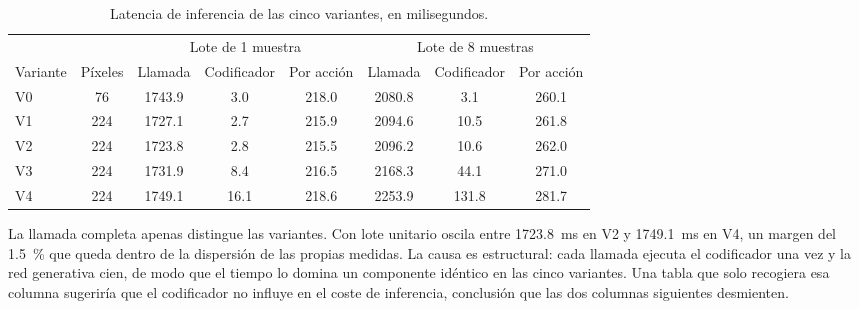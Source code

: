 \begin{table}[htbp]
  \centering
  \caption{Latencia de inferencia de las cinco variantes, en milisegundos.}
  \label{tab:latencia}
  \small
  \begin{tabular}{lccccccc}
    \toprule
    & & \multicolumn{3}{c}{Lote de \num{1} muestra} & \multicolumn{3}{c}{Lote de \num{8} muestras} \\
    \cmidrule(lr){3-5}\cmidrule(lr){6-8}
    Variante & P\'ixeles & Llamada & Codificador & Por acci\'on
             & Llamada & Codificador & Por acci\'on \\
    \midrule
    V0 & \num{76}  & \num{1743.9} & \num{3.0}  & \num{218.0} &
                     \num{2080.8} & \num{3.1}  & \num{260.1} \\
    V1 & \num{224} & \num{1727.1} & \num{2.7}  & \num{215.9} &
                     \num{2094.6} & \num{10.5} & \num{261.8} \\
    V2 & \num{224} & \num{1723.8} & \num{2.8}  & \num{215.5} &
                     \num{2096.2} & \num{10.6} & \num{262.0} \\
    V3 & \num{224} & \num{1731.9} & \num{8.4}  & \num{216.5} &
                     \num{2168.3} & \num{44.1} & \num{271.0} \\
    V4 & \num{224} & \num{1749.1} & \num{16.1} & \num{218.6} &
                     \num{2253.9} & \num{131.8} & \num{281.7} \\
    \bottomrule
  \end{tabular}
\end{table}

La llamada completa apenas distingue las variantes. Con lote unitario oscila entre
\SI{1723.8}{\milli\second} en V2 y \SI{1749.1}{\milli\second} en V4, un margen del
\SI{1.5}{\percent} que queda dentro de la dispersi\'on de las propias medidas. La causa es
estructural: cada llamada ejecuta el codificador una vez y la red generativa cien, de modo
que el tiempo lo domina un componente id\'entico en las cinco variantes. Una tabla que solo
recogiera esa columna sugerir\'ia que el codificador no influye en el coste de inferencia,
conclusi\'on que las dos columnas siguientes desmienten.

